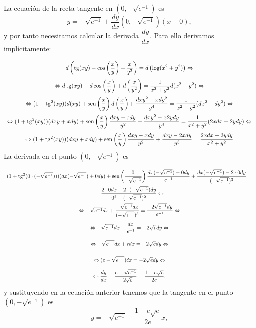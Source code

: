 {La ecuación de la recta tangente en $(0,-\sqrt{e^{-1}})$ es
\begin{equation}
y = -\sqrt{e^{-1}} + \frac{dy}{dx}(0,-\sqrt{e^{-1}})(x-0),
\end{equation}
y por tanto necesitamos calcular la derivada $\dfrac{dy}{dx}$. Para ello derivamos implícitamente:
\[
\renewcommand{\arraystretch}{2.5}
\begin{array}{c}
\displaystyle
d\left(\tg(xy)-\cos\left( \frac{x}{y}\right)+\frac{x}{y^2}\right) = d\left( \log (x^2+y^2)\right) \Leftrightarrow \\ \displaystyle
\Leftrightarrow
d\tg(xy)-d\cos\left(\frac{x}{y}\right)+d\left( \frac{x}{y^2}\right)=
\frac{1}{x^2+y^2}d(x^2+y^2) \Leftrightarrow \\ \displaystyle
\Leftrightarrow
(1+\tg^2(xy))d(xy)+\sen\left( \frac{x}{y}\right)d\left( \frac{x}{y}\right) +\frac{dxy^2-xdy^2}{y^4} =
\frac{1}{x^2+y^2}(dx^2+dy^2) \Leftrightarrow \\ \displaystyle
\Leftrightarrow
(1+\tg^2(xy))(dxy+xdy)+\sen\left( \frac{x}{y}\right) \frac{dxy-xdy}{y^2}+\frac{dxy^2-x2ydy}{y^4} =
\frac{1}{x^2+y^2}(2xdx+2ydy) \Leftrightarrow \\ \displaystyle
\Leftrightarrow
(1+\tg^2(xy))(dxy+xdy)+\sen\left(\frac{x}{y}\right)\frac{dxy-xdy}{y^2}+\frac{dxy-2xdy}{y^3} =
\frac{2xdx+2ydy}{x^2+y^2}
\end{array}
\]
La derivada en el punto $(0,-\sqrt{e^{-1}})$ es
\[
\renewcommand{\arraystretch}{2.5}
\begin{array}{c}\displaystyle
(1+\tg^2(0\cdot
(-\sqrt{e^{-1}})))(dx(-\sqrt{e^{-1}})+0dy)+\sen\left(\frac{0}{-\sqrt{e^{-1}}}\right)\frac{dx(-\sqrt{e^{-1}})-0dy}{e^{-1}}+\frac{dx(-\sqrt{e^{-1}})-2\cdot 0dy}{(-\sqrt{e^{-1}})^3} =\\
\displaystyle
= \frac{2\cdot 0dx+2\cdot (-\sqrt{e^{-1}})dy}{0^2+(-\sqrt{e^{-1}})^2}
\Leftrightarrow\\ \displaystyle
\Leftrightarrow -\sqrt{e^{-1}}dx+\frac{-\sqrt{e^{-1}}dx}{(-\sqrt{e^{-1}})^3} = \frac{-2\sqrt{e^{-1}}dy}{e^{-1}} \Leftrightarrow\\ \displaystyle
\Leftrightarrow -\sqrt{e^{-1}}dx+\frac{dx}{e^{-1}} =
-2\sqrt{e}dy \Leftrightarrow\\ \displaystyle
\Leftrightarrow -\sqrt{e^{-1}}dx+edx = -2\sqrt{e}dy \Leftrightarrow\\
\displaystyle \Leftrightarrow (e-\sqrt{e^{-1}})dx = -2\sqrt{e}dy
\Leftrightarrow\\
\displaystyle \Leftrightarrow \frac{dy}{dx} =
\frac{e-\sqrt{e^{-1}}}{-2\sqrt{e}} = \frac{1-e\sqrt{e}}{2e}.
\end{array}
\]
y sustituyendo en la ecuación anterior tenemos que la tangente en el punto  $(0,-\sqrt{e^{-1}})$ es
\[
y = -\sqrt{e^{-1}} + \frac{1-e\sqrt{e}}{2e} x,
\]

}

